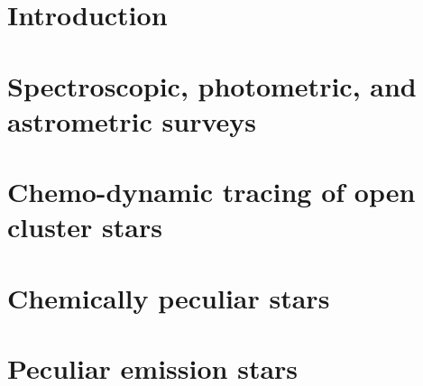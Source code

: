 


\pagestyle{fancy}
\fancyhead[CE,RE]{}
\fancyhead[LO,CO]{}
\fancyhead[LE]{\textbf{\nouppercase{\leftmark}}}
\fancyhead[RO]{\textbf{\nouppercase{\rightmark}}}


\chapter{Introduction}
\label{chap:intro}


\chapter{Spectroscopic, photometric, and astrometric surveys}
\label{chap:surveys}


\chapter{Chemo-dynamic tracing of open cluster stars}
\label{chap:clusters}


\chapter{Chemically peculiar stars}
\label{chap:peculiars_chem}


\chapter{Peculiar emission stars}
\label{chap:peculiars_emis}


